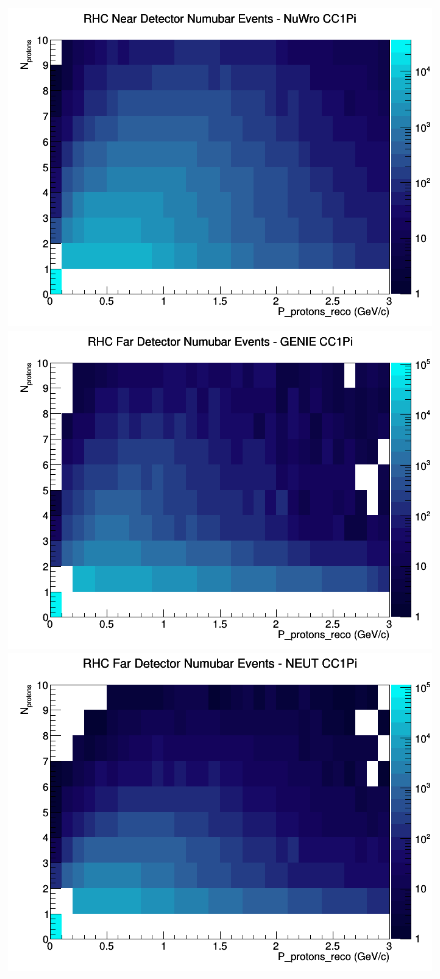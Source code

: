 \begin{figure}[h]
\includegraphics[width=\linewidth]{eff_N_P/GAr/protons/CC1Pi_RHC_ND_numubar_N_P_NuWro.png}
\endminipage
\newline
{}
\includegraphics[width=\linewidth]{eff_N_P/GAr/protons/CC1Pi_RHC_FD_numubar_N_P_GENIE.png}
\endminipage
{}
\includegraphics[width=\linewidth]{eff_N_P/GAr/protons/CC1Pi_RHC_FD_numubar_N_P_NEUT.png}

\end{figure}
